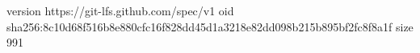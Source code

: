 version https://git-lfs.github.com/spec/v1
oid sha256:8c10d68f516b8e880cfc16f828dd45d1a3218e82dd098b215b895bf2fc8f8a1f
size 991
